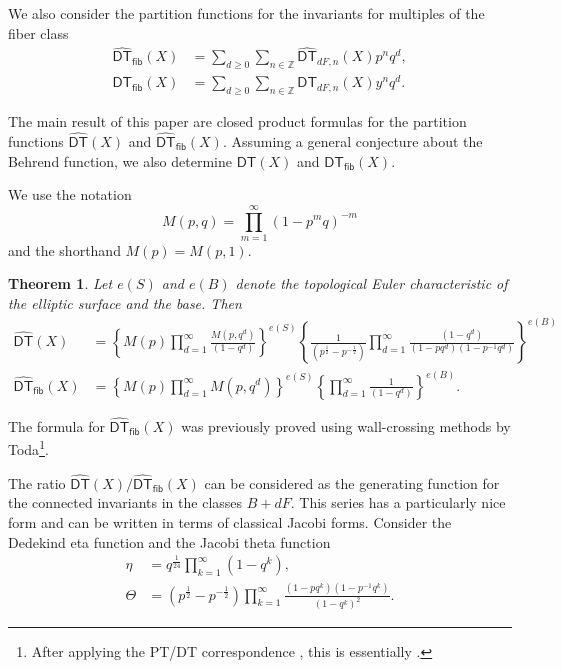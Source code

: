 \documentclass[12pt]{amsart}
\newtheorem{theorem}{Theorem}%
\theoremstyle{definition}
\newcommand{\ZZ} {\mathbb{Z}}		%
\newcommand{\DT}{\mathsf{DT}}
\newcommand{\DThat}{\widehat{\DT}}
\newcommand{\fiber}{\mathsf{fib}}
\newcommand{\half}{\frac{1}{2}}
\begin{document}
We also consider the partition functions for the invariants for
multiples of the fiber class
\begin{align*}
\DThat_{\fiber}(X)& = \sum_{d\geq 0} \sum_{n \in \ZZ} \DThat_{dF,n}(X) p^{n} q^{d} ,\\
\DT_{\fiber}(X)& = \sum_{d\geq 0} \sum_{n \in \ZZ} \DT_{dF,n}(X) y^{n} q^{d} .
\end{align*}


The main result of this paper are closed product formulas for the
partition functions $\DThat (X)$ and $\DThat_{\fiber}(X)$. Assuming a
general conjecture about the Behrend function, we also determine $\DT
(X)$ and $\DT_{\fiber}(X)$.

We use the notation
\[
M(p,q) = \prod_{m=1}^{\infty} (1-p^{m}q)^{-m}
\]
and the shorthand $M(p)=M(p,1)$.

\begin{theorem}\label{thm: main thm -- formulas for DT and DTfiber}
Let $e(S)$ and $e(B)$ denote the topological Euler characteristic of
the elliptic surface and the base. Then
\begin{align*}
\DThat (X) &= \left \{M(p)\prod_{d=1}^{\infty}
\frac{M(p,q^{d})}{(1-q^{d})} \right\}^{e(S)}
\left\{\frac{1}{(p^{\half}-p^{-\half})}\prod_{d=1}^{\infty}\frac{(1-q^{d})}{(1-pq^{d})(1-p^{-1}q^{d})}
\right\}^{e(B)} \\
\DThat_{\fiber}(X) &= \left\{M(p)\prod_{d=1}^{\infty}M(p,q^{d})
\right\}^{e(S)} \left\{\prod_{d=1}^{\infty}\frac{1}{(1-q^{d})}
\right\}^{e(B)}.
\end{align*}
\end{theorem}

The formula for $\DThat_{\fiber}(X)$ was previously proved using
wall-crossing methods by Toda\footnote{After applying the PT/DT
correspondence \cite{Bridgeland-PTDT}, this is essentially 
\cite[Thm~6.9]{Toda-2012-Kyoto}.}.

The ratio $\DThat (X)/\DThat_{\fiber}(X)$ can be considered as the
generating function for the connected invariants in the classes
$B+dF$. This series has a particularly nice form and can be written in
terms of classical Jacobi forms.  Consider the Dedekind eta function
and the Jacobi theta function
\begin{align*}
\eta &= q^{\frac{1}{24}} \prod_{k=1}^{\infty}(1-q^k), \\
\Theta &= 
(p^{\frac{1}{2}} - p^{-\frac{1}{2}}) \prod_{k=1}^{\infty} \frac{(1-p q^k) (1-p^{-1} q^k)}{(1-q^k)^2}.
\end{align*}
\end{document}
